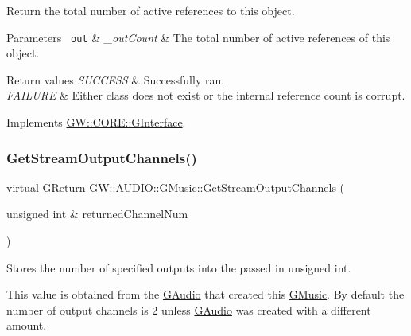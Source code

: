 Return the total number of active references to this object. 


\begin{DoxyParams}[1]{Parameters}
\mbox{\texttt{ out}}  & {\em \+\_\+out\+Count} & The total number of active references of this object.\\
\hline
\end{DoxyParams}

\begin{DoxyRetVals}{Return values}
{\em S\+U\+C\+C\+E\+SS} & Successfully ran. \\
\hline
{\em F\+A\+I\+L\+U\+RE} & Either class does not exist or the internal reference count is corrupt. \\
\hline
\end{DoxyRetVals}


Implements \mbox{\hyperlink{classGW_1_1CORE_1_1GInterface_aacf5834174a7024f8a3c361122ee9e76}{G\+W\+::\+C\+O\+R\+E\+::\+G\+Interface}}.

\mbox{\label{classGW_1_1AUDIO_1_1GMusic_a750dcb654e813c322d7617e1a5ebdf93}} 
\subsubsection{\texorpdfstring{GetStreamOutputChannels()}{GetStreamOutputChannels()}}
{\footnotesize\ttfamily virtual \mbox{\hyperlink{namespaceGW_a67a839e3df7ea8a5c5686613a7a3de21}{G\+Return}} G\+W\+::\+A\+U\+D\+I\+O\+::\+G\+Music\+::\+Get\+Stream\+Output\+Channels (\begin{DoxyParamCaption}\item[{unsigned int \&}]{returned\+Channel\+Num }\end{DoxyParamCaption})\hspace{0.3cm}{\ttfamily [pure virtual]}}



Stores the number of specified outputs into the passed in unsigned int. 

This value is obtained from the \mbox{\hyperlink{classGW_1_1AUDIO_1_1GAudio}{G\+Audio}} that created this \mbox{\hyperlink{classGW_1_1AUDIO_1_1GMusic}{G\+Music}}. By default the number of output channels is 2 unless \mbox{\hyperlink{classGW_1_1AUDIO_1_1GAudio}{G\+Audio}} was created with a different amount.


